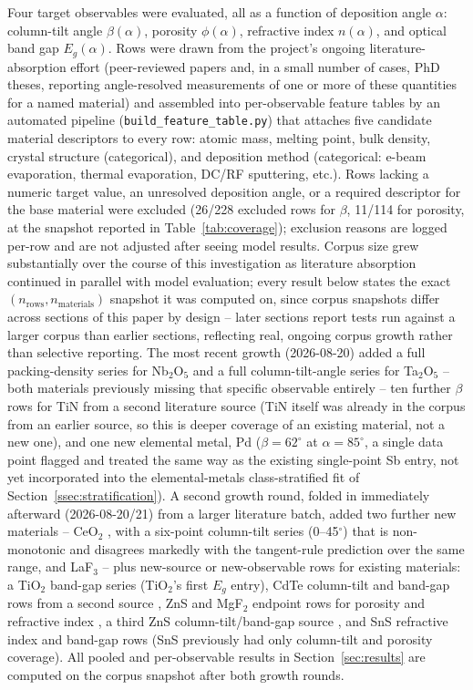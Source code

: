 \documentclass[aip,amsmath,amssymb,reprint]{revtex4-1}
\begin{document}
Four target observables were evaluated, all as a function of
deposition angle $\alpha$: column-tilt angle $\beta(\alpha)$,
porosity $\phi(\alpha)$, refractive index $n(\alpha)$, and optical
band gap $E_g(\alpha)$. Rows were drawn from the project's ongoing
literature-absorption effort (peer-reviewed papers and, in a small
number of cases, PhD theses, reporting angle-resolved measurements of
one or more of these quantities for a named material) and assembled
into per-observable feature tables by an automated pipeline
(\texttt{build\_feature\_table.py}) that attaches five candidate
material descriptors to every row: atomic mass, melting point, bulk
density, crystal structure (categorical), and deposition method
(categorical: e-beam evaporation, thermal evaporation, DC/RF
sputtering, etc.). Rows lacking a numeric target value, an unresolved
deposition angle, or a required descriptor for the base material were
excluded (26/228 excluded rows for $\beta$, 11/114 for porosity, at the
snapshot reported in Table~\ref{tab:coverage}); exclusion reasons are
logged per-row and are not adjusted after seeing model results. Corpus
size grew substantially over the course of this investigation as
literature absorption continued in parallel with model evaluation;
every result below states the exact $(n_{\mathrm{rows}},
n_{\mathrm{materials}})$ snapshot it was computed on, since corpus
snapshots differ across sections of this paper by design -- later
sections report tests run against a larger corpus than earlier
sections, reflecting real, ongoing corpus growth rather than
selective reporting. The most recent growth (2026-08-20) added a
full packing-density series for Nb$_2$O$_5$ \citep{xiao2008} and a
full column-tilt-angle series for Ta$_2$O$_5$ \citep{sobahan2009} --
both materials previously missing that specific observable entirely
-- ten further $\beta$ rows for TiN from a second literature source
\citep{bouaouina2018} (TiN itself was already in the corpus from an
earlier source, so this is deeper coverage of an existing material,
not a new one), and one new elemental metal, Pd \citep{kim2005pd}
($\beta=62^{\circ}$ at $\alpha=85^{\circ}$, a single data point
flagged and treated the same way as the existing single-point Sb
entry, not yet incorporated into the elemental-metals
class-stratified fit of Section~\ref{ssec:stratification}). A second
growth round, folded in immediately afterward (2026-08-20/21) from a
larger literature batch, added two further new materials -- CeO$_2$
\citep{hodgkinson1996}, with a six-point column-tilt series
(0--45$^{\circ}$) that is non-monotonic and disagrees markedly with
the tangent-rule prediction over the same range, and LaF$_3$
\citep{liu2007} -- plus new-source or new-observable rows for
existing materials: a TiO$_2$ band-gap series \citep{pandey2022}
(TiO$_2$'s first $E_g$ entry), CdTe column-tilt and band-gap rows
from a second source \citep{ehsani2013}, ZnS and MgF$_2$ endpoint
rows for porosity and refractive index \citep{oh2020}, a third ZnS
column-tilt/band-gap source \citep{ashrafi2018}, and SnS refractive
index and band-gap rows \citep{sazideh2017,sazideh2018} (SnS
previously had only column-tilt and porosity coverage). All pooled
and per-observable results in Section~\ref{sec:results} are computed
on the corpus snapshot after both growth rounds.
\end{document}
